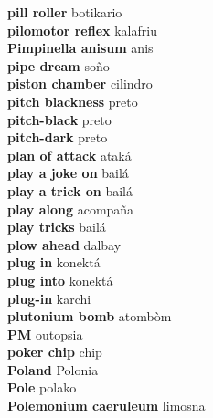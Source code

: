 \textbf{ pill roller  } botikario \\
\textbf{ pilomotor reflex  } kalafriu \\
\textbf{ Pimpinella anisum  } anis \\
\textbf{ pipe dream  } soño \\
\textbf{ piston chamber  } cilindro \\
\textbf{ pitch blackness  } preto \\
\textbf{ pitch-black  } preto \\
\textbf{ pitch-dark  } preto \\
\textbf{ plan of attack  } ataká \\
\textbf{ play a joke on  } bailá \\
\textbf{ play a trick on  } bailá \\
\textbf{ play along  } acompaña \\
\textbf{ play tricks  } bailá \\
\textbf{ plow ahead  } dalbay \\
\textbf{ plug in  } konektá \\
\textbf{ plug into  } konektá \\
\textbf{ plug-in  } karchi \\
\textbf{ plutonium bomb  } atombòm \\
\textbf{ PM  } outopsia \\
\textbf{ poker chip  } chip \\
\textbf{ Poland  } Polonia \\
\textbf{ Pole  } polako \\
\textbf{ Polemonium caeruleum  } limosna \\
